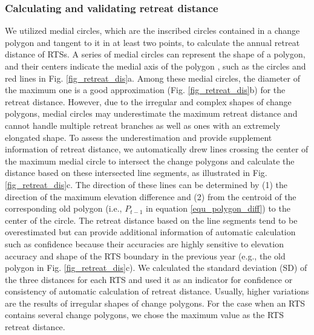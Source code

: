 \documentclass[authoryear,preprint,review,12pt]{elsarticle}
\begin{document}
\subsubsection{Calculating and validating retreat distance}
\label{sec_cal_retreat_dis}

We utilized medial circles, which are the inscribed circles contained in a change polygon and tangent to it in at least two points, to calculate the annual retreat distance of RTSs. 
A series of medial circles can represent the shape of a polygon, and their centers indicate the medial axis of the polygon \citep{zhu2014computing}, such as the circles and red lines in Fig. \ref{fig_retreat_dis}a. 
Among these medial circles, the diameter of the maximum one is a good approximation (Fig. \ref{fig_retreat_dis}b) for the retreat distance.
However, due to the irregular and complex  shapes of change polygons, medial circles may underestimate the maximum retreat distance and cannot handle multiple retreat branches as well as ones with an extremely elongated shape. 
To assess the underestimation and provide supplement information of retreat distance, we automatically 
drew lines crossing the center of the maximum medial circle to intersect the change polygons and calculate the distance based on these intersected line segments, as illustrated in Fig. \ref{fig_retreat_dis}c. 
The direction of these lines can be determined by (1) the direction of the maximum elevation difference and (2) from the centroid of the corresponding old polygon (i.e., $P_{t-1}$ in equation \ref{equ_polygon_diff}) to the center of the circle. 
The retreat distance based on the line segments tend to be overestimated but can provide additional information of automatic calculation such as confidence because their accuracies are highly sensitive to elevation accuracy and shape of the RTS boundary in the previous year (e.g., the old polygon in Fig. \ref{fig_retreat_dis}c). 
We calculated the standard deviation (SD) of the three distances for each RTS and used it as an indicator for confidence or consistency of automatic calculation of retreat distance. 
Usually, higher variations are the results of irregular shapes of change polygons.
For the case when an RTS contains several change polygons, we chose the maximum value as the RTS retreat distance.
\end{document}
